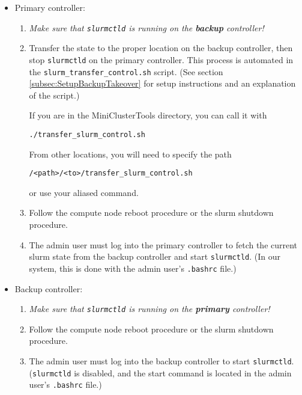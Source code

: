 \begin{itemize}
  \item Primary controller:

    \begin{enumerate}
      \item \emph{Make sure that \emph{\texttt{slurmctld}} is running on the \textbf{backup} controller!}

      \item Transfer the state to the proper location on the backup controller, then stop \texttt{slurmctld} on the primary controller. This process is automated in the \texttt{slurm\_transfer\_control.sh} script. (See section \ref{subsec:SetupBackupTakeover} for setup instructions and an explanation of the script.)

        If you are in the MiniClusterTools directory, you can call it with 

          \texttt{./transfer\_slurm\_control.sh}

        From other locations, you will need to specify the path

          \texttt{/<path>/<to>/transfer\_slurm\_control.sh}

        or use your aliased command.

      \item Follow the compute node reboot procedure or the slurm shutdown procedure.

      \item The admin user must log into the primary controller to fetch the current slurm state from the backup controller and start \texttt{slurmctld}. (In our system, this is done with the admin user's \texttt{.bashrc} file.)

    \end{enumerate}

  \item Backup controller: 
  
    \begin{enumerate}
      \item \emph{Make sure that \emph{\texttt{slurmctld}} is running on the \textbf{primary} controller!}

      \item Follow the compute node reboot procedure or the slurm shutdown procedure.

      \item The admin user must log into the backup controller to start \texttt{slurmctld}. (\texttt{slurmctld} is disabled, and the start command is located in the admin user's \texttt{.bashrc} file.)
    \end{enumerate}

\end{itemize}

